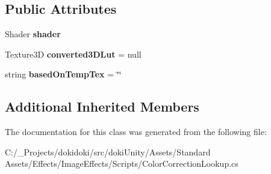 \subsection*{Public Attributes}
\begin{DoxyCompactItemize}
\item 
Shader {\bfseries shader}\hypertarget{class_unity_standard_assets_1_1_image_effects_1_1_color_correction_lookup_a9b8af0c83a74f9930705c1bf4a14d236}{}\label{class_unity_standard_assets_1_1_image_effects_1_1_color_correction_lookup_a9b8af0c83a74f9930705c1bf4a14d236}

\item 
Texture3D {\bfseries converted3\+D\+Lut} = null\hypertarget{class_unity_standard_assets_1_1_image_effects_1_1_color_correction_lookup_af350058ffe0b24dcb61a7b0b98160c47}{}\label{class_unity_standard_assets_1_1_image_effects_1_1_color_correction_lookup_af350058ffe0b24dcb61a7b0b98160c47}

\item 
string {\bfseries based\+On\+Temp\+Tex} = \char`\"{}\char`\"{}\hypertarget{class_unity_standard_assets_1_1_image_effects_1_1_color_correction_lookup_a8775b4fe40aa38f5b0d755a434c6ca93}{}\label{class_unity_standard_assets_1_1_image_effects_1_1_color_correction_lookup_a8775b4fe40aa38f5b0d755a434c6ca93}

\end{DoxyCompactItemize}
\subsection*{Additional Inherited Members}


The documentation for this class was generated from the following file\+:\begin{DoxyCompactItemize}
\item 
C\+:/\+\_\+\+Projects/dokidoki/src/doki\+Unity/\+Assets/\+Standard Assets/\+Effects/\+Image\+Effects/\+Scripts/Color\+Correction\+Lookup.\+cs\end{DoxyCompactItemize}
